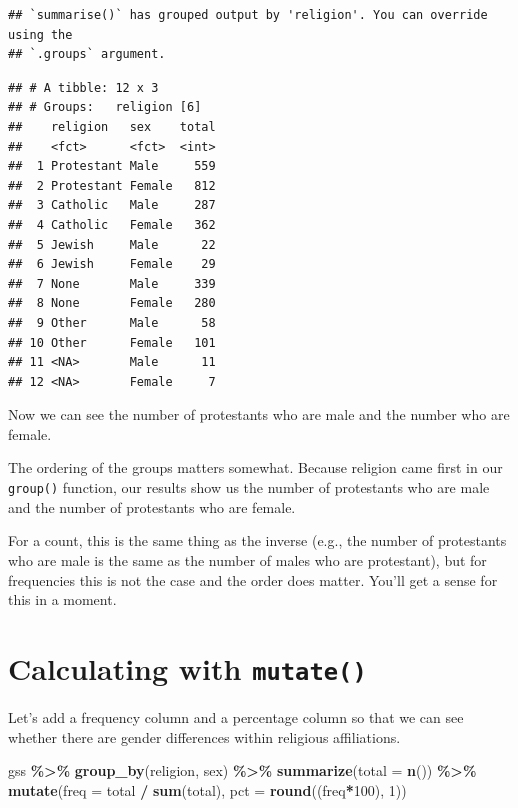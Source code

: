 \documentclass[
]{book}
\newenvironment{Shaded}{\begin{snugshade}}{\end{snugshade}}
\newcommand{\AttributeTok}[1]{\textcolor[rgb]{0.13,0.29,0.53}{#1}}
\newcommand{\DecValTok}[1]{\textcolor[rgb]{0.00,0.00,0.81}{#1}}
\newcommand{\FunctionTok}[1]{\textcolor[rgb]{0.13,0.29,0.53}{\textbf{#1}}}
\newcommand{\NormalTok}[1]{#1}
\newcommand{\SpecialCharTok}[1]{\textcolor[rgb]{0.81,0.36,0.00}{\textbf{#1}}}
\begin{document}
\begin{verbatim}
## `summarise()` has grouped output by 'religion'. You can override using the
## `.groups` argument.
\end{verbatim}

\begin{verbatim}
## # A tibble: 12 x 3
## # Groups:   religion [6]
##    religion   sex    total
##    <fct>      <fct>  <int>
##  1 Protestant Male     559
##  2 Protestant Female   812
##  3 Catholic   Male     287
##  4 Catholic   Female   362
##  5 Jewish     Male      22
##  6 Jewish     Female    29
##  7 None       Male     339
##  8 None       Female   280
##  9 Other      Male      58
## 10 Other      Female   101
## 11 <NA>       Male      11
## 12 <NA>       Female     7
\end{verbatim}

Now we can see the number of protestants who are male and the number who are female.

The ordering of the groups matters somewhat. Because religion came first in our \texttt{group()} function, our results show us the number of protestants who are male and the number of protestants who are female.

For a count, this is the same thing as the inverse (e.g., the number of protestants who are male is the same as the number of males who are protestant), but for frequencies this is not the case and the order does matter. You'll get a sense for this in a moment.

\hypertarget{calculating-with-mutate}{%
\section{\texorpdfstring{Calculating with \texttt{mutate()}}{Calculating with mutate()}}\label{calculating-with-mutate}}

Let's add a frequency column and a percentage column so that we can see whether there are gender differences within religious affiliations.

\begin{Shaded}
\begin{Highlighting}[]
\NormalTok{gss }\SpecialCharTok{\%\textgreater{}\%}
  \FunctionTok{group\_by}\NormalTok{(religion, sex) }\SpecialCharTok{\%\textgreater{}\%}
  \FunctionTok{summarize}\NormalTok{(}\AttributeTok{total =} \FunctionTok{n}\NormalTok{()) }\SpecialCharTok{\%\textgreater{}\%}
  \FunctionTok{mutate}\NormalTok{(}\AttributeTok{freq =}\NormalTok{ total }\SpecialCharTok{/} \FunctionTok{sum}\NormalTok{(total),}
         \AttributeTok{pct =} \FunctionTok{round}\NormalTok{((freq}\SpecialCharTok{*}\DecValTok{100}\NormalTok{), }\DecValTok{1}\NormalTok{))}
\end{Highlighting}
\end{Shaded}
\end{document}
